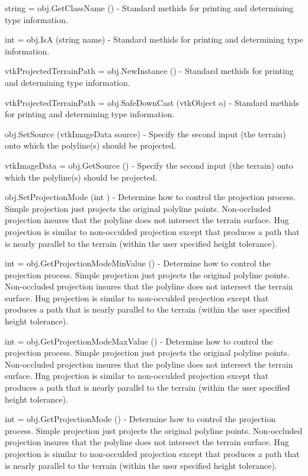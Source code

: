 \begin{DoxyItemize}
\item {\ttfamily string = obj.\-Get\-Class\-Name ()} -\/ Standard methids for printing and determining type information.  
\item {\ttfamily int = obj.\-Is\-A (string name)} -\/ Standard methids for printing and determining type information.  
\item {\ttfamily vtk\-Projected\-Terrain\-Path = obj.\-New\-Instance ()} -\/ Standard methids for printing and determining type information.  
\item {\ttfamily vtk\-Projected\-Terrain\-Path = obj.\-Safe\-Down\-Cast (vtk\-Object o)} -\/ Standard methids for printing and determining type information.  
\item {\ttfamily obj.\-Set\-Source (vtk\-Image\-Data source)} -\/ Specify the second input (the terrain) onto which the polyline(s) should be projected.  
\item {\ttfamily vtk\-Image\-Data = obj.\-Get\-Source ()} -\/ Specify the second input (the terrain) onto which the polyline(s) should be projected.  
\item {\ttfamily obj.\-Set\-Projection\-Mode (int )} -\/ Determine how to control the projection process. Simple projection just projects the original polyline points. Non-\/occluded projection insures that the polyline does not intersect the terrain surface. Hug projection is similar to non-\/occulded projection except that produces a path that is nearly parallel to the terrain (within the user specified height tolerance).  
\item {\ttfamily int = obj.\-Get\-Projection\-Mode\-Min\-Value ()} -\/ Determine how to control the projection process. Simple projection just projects the original polyline points. Non-\/occluded projection insures that the polyline does not intersect the terrain surface. Hug projection is similar to non-\/occulded projection except that produces a path that is nearly parallel to the terrain (within the user specified height tolerance).  
\item {\ttfamily int = obj.\-Get\-Projection\-Mode\-Max\-Value ()} -\/ Determine how to control the projection process. Simple projection just projects the original polyline points. Non-\/occluded projection insures that the polyline does not intersect the terrain surface. Hug projection is similar to non-\/occulded projection except that produces a path that is nearly parallel to the terrain (within the user specified height tolerance).  
\item {\ttfamily int = obj.\-Get\-Projection\-Mode ()} -\/ Determine how to control the projection process. Simple projection just projects the original polyline points. Non-\/occluded projection insures that the polyline does not intersect the terrain surface. Hug projection is similar to non-\/occulded projection except that produces a path that is nearly parallel to the terrain (within the user specified height tolerance).  

\end{DoxyItemize}
